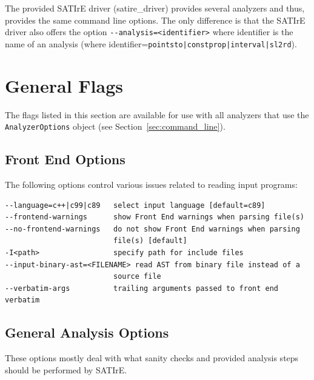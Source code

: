 \documentclass[a4paper,12pt]{report}
\begin{document}
The provided SATIrE driver (satire\_driver) provides several analyzers
and thus, provides the same command line options. The only difference
is that the SATIrE driver also offers the option
\verb+--analysis=<identifier>+ where identifier is the name of an
analysis (where identifier=\verb+pointsto|constprop|interval|sl2rd+).

\section{General Flags}
\label{sec:general_flags}

The flags listed in this section are available for use with all analyzers
that use the \texttt{AnalyzerOptions} object (see
Section~\ref{sec:command_line}).

\subsection{Front End Options}

The following options control various issues related to reading input
programs:
{\footnotesize
\begin{verbatim}
--language=c++|c99|c89   select input language [default=c89]
--frontend-warnings      show Front End warnings when parsing file(s)
--no-frontend-warnings   do not show Front End warnings when parsing
                         file(s) [default]
-I<path>                 specify path for include files
--input-binary-ast=<FILENAME> read AST from binary file instead of a
                         source file
--verbatim-args          trailing arguments passed to front end verbatim
\end{verbatim}
}

\subsection{General Analysis Options}

These options mostly deal with what sanity checks and provided analysis
steps should be performed by SATIrE.
\end{document}
